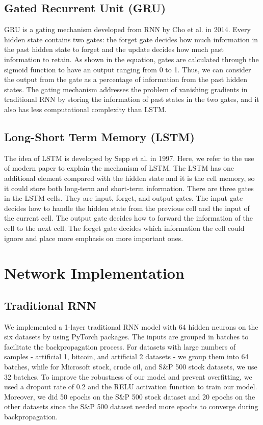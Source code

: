 \documentclass[letterpaper, 10 pt, conference]{ieeeconf}  %
\begin{document}
    \subsection{Gated Recurrent Unit (GRU)}
        GRU is a gating mechanism developed from RNN by Cho et al. in 2014. Every hidden state contains two gates: the forget gate decides how much information in the past hidden state to forget and the update decides how much past information to retain. As shown in the equation, gates are calculated through the sigmoid function to have an output ranging from 0 to 1. Thus, we can consider the output from the gate as a percentage of information from the past hidden states. The gating mechanism addresses the problem of vanishing gradients in traditional RNN by storing the information of past states in the two gates, and it also has less computational complexity than LSTM.

    \subsection{Long-Short Term Memory (LSTM)}
        The idea of LSTM is developed by Sepp et al. in 1997. Here, we refer to the use of modern paper to explain the mechanism of LSTM. The LSTM has one additional element compared with the hidden state and it is the cell memory, so it could store both long-term and short-term information. There are three gates in the LSTM cells. They are input, forget, and output gates. The input gate decides how to handle the hidden state from the previous cell and the input of the current cell. The output gate decides how to forward the information of the cell to the next cell. The forget gate decides which information the cell could ignore and place more emphasis on more important ones. 

\section{Network Implementation}
    \subsection{Traditional RNN}
        We implemented a 1-layer traditional RNN model with 64 hidden neurons on the six datasets by using PyTorch packages. The inputs are grouped in batches to facilitate the backpropagation process. For datasets with large numbers of samples - artificial 1, bitcoin, and artificial 2 datasets - we group them into 64 batches, while for Microsoft stock, crude oil, and S\&P 500 stock datasets, we use 32 batches. To improve the robustness of our model and prevent overfitting, we used a dropout rate of 0.2 and the RELU activation function to train our model. Moreover, we did 50 epochs on the S\&P 500 stock dataset and 20 epochs on the other datasets since the S\&P 500 dataset needed more epochs to converge during backpropagation. 
\end{document}
